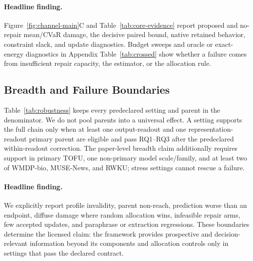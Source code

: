 \paragraph{Headline finding.}
{\setlength{\emergencystretch}{3em}\ProtectionHeadline\par}

Figure~\ref{fig:channel-main}C and Table~\ref{tab:core-evidence} report
proposed and no-repair mean/CVaR damage, the decisive paired bound, native
retained behavior, constraint slack, and update diagnostics. Budget sweeps and
oracle or exact-energy diagnostics in Appendix Table~\ref{tab:crossed} show
whether a failure comes from insufficient repair capacity, the estimator, or
the allocation rule.

\subsection{Breadth and Failure Boundaries}
\label{sec:exp-supporting}

Table~\ref{tab:robustness} keeps every predeclared setting and parent in the
denominator. We do not pool parents into a universal effect. A setting
supports the full chain only when at least one output-readout and one
representation-readout primary parent are eligible and pass RQ1--RQ3
after the predeclared within-readout correction. The paper-level breadth claim
additionally requires support in primary TOFU, one non-primary model
scale/family, and at least two of WMDP-bio, MUSE-News, and RWKU; stress settings
cannot rescue a failure.

\paragraph{Headline finding.}
{\setlength{\emergencystretch}{3em}\TransferHeadline\par}

We explicitly report profile invalidity, parent non-reach, prediction worse
than an endpoint, diffuse damage where random allocation wins,
infeasible repair arms, few accepted updates, and paraphrase or extraction
regressions. These boundaries determine the licensed claim: the framework
provides prospective and decision-relevant information beyond its components
and allocation controls only in settings that pass the declared contract.
